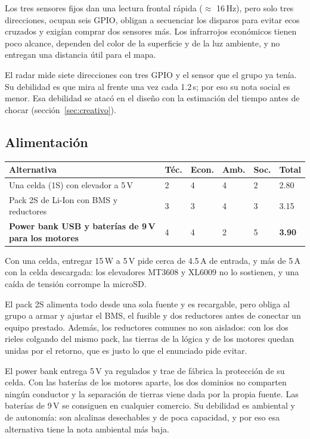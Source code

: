 \documentclass[11pt,a4paper]{article}
\begin{document}
Los tres sensores fijos dan una lectura frontal rápida ($\approx$ 16\,Hz),
pero solo tres direcciones, ocupan seis GPIO, obligan a secuenciar los
disparos para evitar ecos cruzados y exigían comprar dos sensores más. Los
infrarrojos económicos tienen poco alcance, dependen del color de la
superficie y de la luz ambiente, y no entregan una distancia útil para el
mapa.

El radar mide siete direcciones con tres GPIO y el sensor que el grupo ya
tenía. Su debilidad es que mira al frente una vez cada 1.2\,s; por eso su
nota social es menor. Esa debilidad se atacó en el diseño con la estimación
del tiempo antes de chocar (sección~\ref{sec:creativo}).

\subsection{Alimentación}

\begin{center}
\begin{tabularx}{\linewidth}{Y C{1.25cm}C{1.4cm}C{1.4cm}C{1.1cm}C{1.2cm}}
\toprule
\textbf{Alternativa} & \textbf{Téc.} & \textbf{Econ.} & \textbf{Amb.} &
\textbf{Soc.} & \textbf{Total} \\
\midrule
Una celda (1S) con elevador a 5\,V & 2 & 4 & 4 & 2 & 2.80 \\
Pack 2S de Li-Ion con BMS y reductores & 3 & 3 & 4 & 3 & 3.15 \\
\textbf{Power bank USB y baterías de 9\,V para los motores} & 4 & 4 & 2 & 5 &
\textbf{3.90} \\
\bottomrule
\end{tabularx}
\end{center}

Con una celda, entregar 15\,W a 5\,V pide cerca de 4.5\,A de entrada, y más
de 5\,A con la celda descargada: los elevadores MT3608 y XL6009 no lo
sostienen, y una caída de tensión corrompe la microSD.

El pack 2S alimenta todo desde una sola fuente y es recargable, pero obliga
al grupo a armar y ajustar el BMS, el fusible y dos reductores antes de
conectar un equipo prestado. Además, los reductores comunes no son aislados:
con los dos rieles colgando del mismo pack, las tierras de la lógica y de los
motores quedan unidas por el retorno, que es justo lo que el enunciado pide
evitar.

El power bank entrega 5\,V ya regulados y trae de fábrica la protección de su
celda. Con las baterías de los motores aparte, los dos dominios no comparten
ningún conductor y la separación de tierras viene dada por la propia fuente.
Las baterías de 9\,V se consiguen en cualquier comercio. Su debilidad es
ambiental y de autonomía: son alcalinas desechables y de poca capacidad, y
por eso esa alternativa tiene la nota ambiental más baja.
\end{document}
